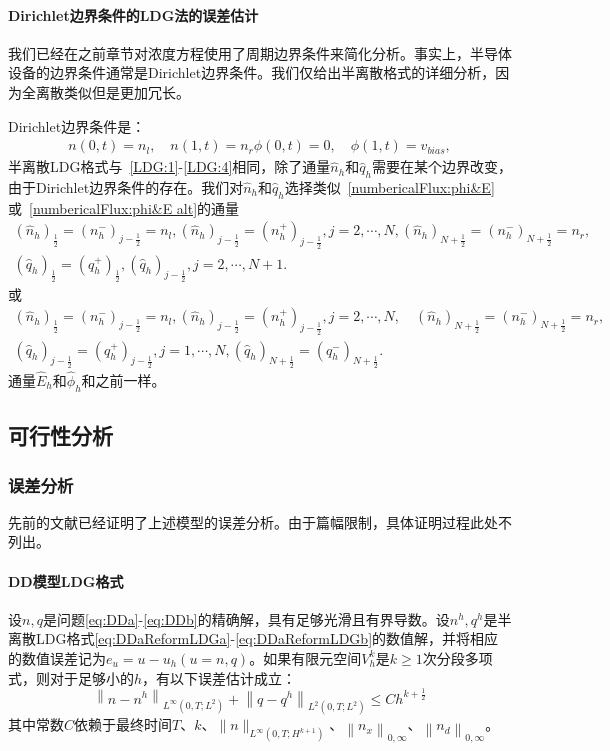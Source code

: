 \paragraph{Dirichlet边界条件的LDG法的误差估计}
我们已经在之前章节对浓度方程使用了周期边界条件来简化分析。事实上，半导体设备的边界条件通常是Dirichlet边界条件。我们仅给出半离散格式的详细分析，因为全离散类似但是更加冗长。

Dirichlet边界条件是：
\begin{align}
    n(0,t) = n_l,\quad n(1,t) = n_r
    \phi(0,t) = 0, \quad \phi(1,t) = v_{bias},
\end{align}
半离散LDG格式与~\eqref{LDG:1}-\eqref{LDG:4}相同，除了通量$\hat{n}_h$和$\hat{q}_h$需要在某个边界改变，由于Dirichlet边界条件的存在。我们对$\hat{n}_h$和$\hat{q}_h$选择类似~\eqref{numbericalFlux:phi&E}或~\eqref{numbericalFlux:phi&E alt}的通量
\begin{align}
    (\hat{n}_h)_{\frac{1}{2}} = (n_h^-)_{j-\frac{1}{2}} =n_l, (\hat{n}_h)_{j-\frac{1}{2}} =  (n_h^+)_{j-\frac{1}{2}},j=2,\cdots,N,  (\hat{n}_h)_{N+\frac{1}{2}} = (n_h^-)_{N+\frac{1}{2}} = n_r, \nonumber \\
    (\hat{q}_h)_{\frac{1}{2}} = (q_h^+)_{\frac{1}{2}}, (\hat{q}_h)_{j-\frac{1}{2}},j=2,\cdots,N+1. \label{numbericalFlux:Dirichlet 1}
\end{align}
或
\begin{align}
    (\hat{n}_h)_{\frac{1}{2}} = (n_h^-)_{j-\frac{1}{2}} = n_l, (\hat{n}_h)_{j-\frac{1}{2}} = (n_h^+)_{j-\frac{1}{2}},j=2,\cdots,N,\quad (\hat{n}_h)_{N+\frac{1}{2}} = (n_h^-)_{N+\frac{1}{2}} = n_r, \nonumber \\
    (\hat{q}_h)_{j - \frac{1}{2}} = (q_h^+)_{j - \frac{1}{2}}, j = 1,\cdots,N,(\hat{q}_h)_{N+\frac{1}{2}} = (q_h^-)_{N+\frac{1}{2}}.\label{numbericalFlux:Dirichlet 2}
\end{align}
通量$\hat{E}_h$和$\hat{\phi}_h$和之前一样。

\subsection{可行性分析}
\subsubsection{误差分析}

先前的文献已经证明了上述模型的误差分析。由于篇幅限制，具体证明过程此处不列出。
\paragraph{DD模型LDG格式}
\begin{theorem}
    设$n, q$是问题\eqref{eq:DDa}-\eqref{eq:DDb}的精确解，具有足够光滑且有界导数。设$n^{h}, q^{h}$是半离散LDG格式\eqref{eq:DDaReformLDGa}-\eqref{eq:DDaReformLDGb}的数值解，并将相应的数值误差记为$e_{u}=u-u_{h}(u=n, q)$。如果有限元空间$V_{h}^{k}$是$k \geq 1$次分段多项式，则对于足够小的$h$，有以下误差估计成立：
    $$
        \left\|n-n^{h}\right\|_{L^{\infty}\left(0, T ; L^{2}\right)}+\left\|q-q^{h}\right\|_{L^{2}\left(0, T ; L^{2}\right)} \leq C h^{k+\frac{1}{2}}
    $$
    其中常数$C$依赖于最终时间$T$、$k$、$\|n\|_{L^{\infty}\left(0, T ; H^{k+1}\right)}$、$\left\|n_{x}\right\|_{0, \infty}$、$\left\|n_{d}\right\|_{0, \infty}$。
\end{theorem}
